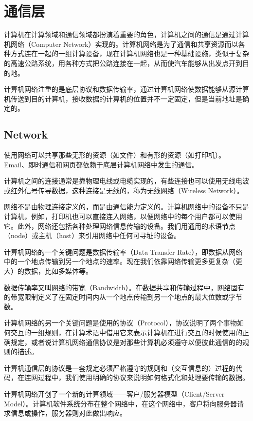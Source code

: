\part{通信层}

计算机在计算领域和通信领域都扮演着重要的角色，计算机之间的通信是通过计算机网络（Computer Network）实现的。计算机网络是为了通信和共享资源而以各种方式连在一起的一组计算设备，现在计算机网络也是一种基础设施，类似于复杂的高速公路系统，用各种方式把公路连接在一起，从而使汽车能够从出发点开到目的地。

计算机网络注重的是底层协议和数据传输率，通过计算机网络使数据能够从源计算机传送到目的计算机，接收数据的计算机的位置并不一定固定，但是当前地址是确定的。


\chapter{Network}

使用网络可以共享那些无形的资源（如文件）和有形的资源（如打印机）。Email、即时通信和网页都依赖于底层计算机网络中发生的通信。

计算机之间的连接通常是靠物理电线或电缆实现的，有些连接也可以使用无线电波或红外信号传导数据，这种连接是无线的，称为无线网络（Wireless Network）。

网络不是由物理连接定义的，而是由通信能力定义的。计算机网络中的设备不只是计算机，例如，打印机也可以直接连入网络，以便网络中的每个用户都可以使用它。此外，网络还包括各种处理网络信息传输的设备。我们用通用的术语节点（node）或主机（host）来引用网络中任何可寻址的设备。

计算机网络的一个关键问题是数据传输率（Data Transfer Rate），即数据从网络中的一个地点传输到另一个地点的速率。现在我们依靠网络传输更多更复杂（更大）的数据，比如多媒体等。

数据传输率又叫网络的带宽（Bandwidth）。在数据共享和传输过程中，网络固有的带宽限制定义了在固定时间内从一个地点传输到另一个地点的最大位数或字节数。

计算机网络的另一个关键问题是使用的协议（Protocol），协议说明了两个事物如何交互的一组规则，在计算术语中借用它来表示计算机在进行交互的时候使用的正确规定，或者说计算机网络通信协议是对那些计算机必须遵守以便彼此通信的的规则的描述。

计算机通信层的协议是一套规定必须严格遵守的规则和（交互信息的）过程的代码，在连网过程中，我们使用明确的协议来说明如何格式化和处理要传输的数据。

计算机网络开创了一个新的计算领域——客户/服务器模型（Client/Server Model）。计算机软件系统分布在整个网络中，在这个网络中，客户将向服务器请求信息或操作，服务器则对此做出响应。

